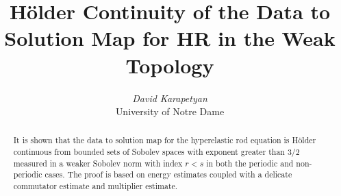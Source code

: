 \documentclass[12pt,reqno]{amsart}
\numberwithin{equation}{section}  %
\numberwithin{figure}{section}
\begin{document}
\title[H\"older Continuity of the Data to Solution Map for HR]{H\"older Continuity of the Data to Solution Map for HR in the
Weak Topology}
\author{\textit{David Karapetyan} \\ University of Notre Dame}
\address{Department of Mathematics  \\
University  of Notre Dame\\
Notre Dame, IN 46556 }
\date{}

\begin{abstract}
It is shown that the data to solution map for the hyperelastic rod equation is
H\"older continuous from bounded sets of Sobolev spaces with exponent greater
than 3/2 measured in a weaker Sobolev norm with index $r < s$ in both the
periodic and non-periodic cases. The proof is based on energy estimates coupled
with a delicate commutator estimate and multiplier estimate. 
\end{abstract}


%




\maketitle
%
%
%
%
%
%        
%
\end{document}
